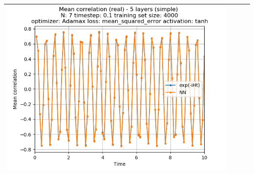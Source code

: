 \documentclass{article}
\begin{document}
\begin{tabular}{|c|c|c|c|}
     \includegraphics[scale=0.37]{./5_layers_simple_train_samples=4000_timestep=0.1_t_total=10.0_optimizer=Adamax_loss=mean_squared_error_activation=tanh/Corr_N=7_(real).png} \\ \hline


\end{tabular}
\end{document}
